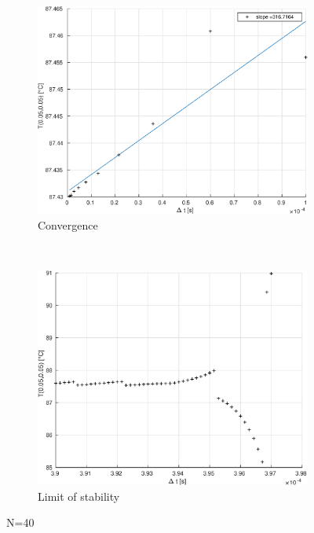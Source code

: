 \documentclass[a4paper,12pt,twoside]{article}
\begin{document}
\begin{figure}[h]
  \centering
  \begin{subfigure}[t]{0.45\textwidth}
    \includegraphics[width=\textwidth]{graphs/b_conv80.eps}

    \caption{Convergence}
    \label{fig:b-conv80}
  \end{subfigure}
  ~
  \begin{subfigure}[t]{0.45\textwidth}
    \includegraphics[width=\textwidth]{graphs/b_lim80.eps}
    \caption{Limit of stability}
    \label{fig:b-lim80}
  \end{subfigure}
  \caption{N=40}
  \label{fig:b80}
\end{figure}
\end{document}

